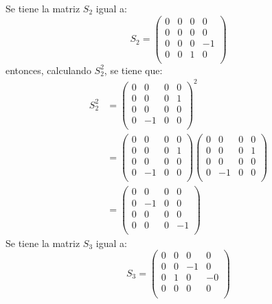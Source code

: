     Se tiene la matriz $S_2$ igual a:
    \begin{equation*}
        S_2 =\left( \begin{matrix}
            0 & 0 & 0 & 0 \\
            0 & 0 & 0 & 0 \\
            0 & 0 & 0 & -1 \\
            0 & 0 & 1 & 0 \\
        \end{matrix}\right)
    \end{equation*}
    entonces, calculando $S_2^2$, se tiene que:
    \begin{align*}
        S_2^2 &=\left( \begin{matrix}
            0 & 0 & 0 & 0 \\
            0 & 0 & 0 & 1 \\
            0 & 0 & 0 & 0 \\
            0 & -1 & 0 & 0 \\
        \end{matrix}\right)^2 \\
        & =\left( \begin{matrix}
            0 & 0 & 0 & 0 \\
            0 & 0 & 0 & 1 \\
            0 & 0 & 0 & 0 \\
            0 & -1 & 0 & 0 \\
        \end{matrix}\right)\left( \begin{matrix}
            0 & 0 & 0 & 0 \\
            0 & 0 & 0 & 1 \\
            0 & 0 & 0 & 0 \\
            0 & -1 & 0 & 0 \\
        \end{matrix}\right)\\
        & =\left( \begin{matrix}
            0 & 0 & 0 & 0 \\
            0 & -1 & 0 & 0 \\
            0 & 0 & 0 & 0 \\
            0 & 0 & 0 & -1 \\
        \end{matrix}\right)
    \end{align*}
    Se tiene la matriz $S_3$ igual a:
    \begin{equation*}
        S_3 =\left( \begin{matrix}
            0 & 0 & 0 & 0 \\
            0 & 0 & -1 & 0 \\
            0 & 1 & 0 & -0 \\
            0 & 0 & 0 & 0 \\
        \end{matrix}\right)
    \end{equation*}

